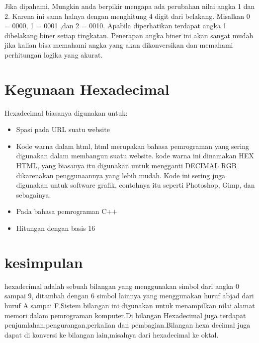 \documentclass{article}
\begin{document}
 Jika dipahami, Mungkin anda berpikir mengapa ada perubahan nilai angka 1 dan 2. Karena ini sama halnya dengan menghitung 4 digit dari belakang.
 Misalkan 0 = 0000, 1 = 0001 ,dan 2 = 0010. Apabila diperhatikan terdapat angka 1 dibelakang biner setiap tingkatan. Penerapan angka biner ini
 akan sangat mudah jika kalian bisa memahami angka yang akan dikonversikan dan memahami perhitungan logika yang akurat.

\section {Kegunaan Hexadecimal}
 Hexadecimal biasanya digunakan untuk:
 \begin{itemize}
   \item Spasi pada URL suatu website
   \item Kode warna dalam html, html merupakan bahasa pemrograman yang sering digunakan dalam membangun suatu website. kode warna ini dinamakan HEX HTML, yang biasanya itu digunakan untuk mengganti DECIMAL RGB dikarenakan penggunaannya yang lebih mudah. Kode ini sering juga digunakan untuk software grafik, contohnya itu seperti Photoshop, Gimp, dan sebagainya.
   \item Pada bahasa pemrograman C++
   \item Hitungan dengan basis 16
 \end{itemize}

\section{kesimpulan}
 hexadecimal adalah sebuah bilangan yang menggunakan simbol dari angka 0 sampai 9, ditambah dengan 6 simbol lainnya yang menggunakan huruf abjad dari huruf A sampai F.Sistem bilangan ini digunakan untuk menampilkan nilai alamat memori dalam pemrograman komputer.Di bilangan Hexadecimal juga terdapat penjumlahan,pengurangan,perkalian dan pembagian.Bilangan hexa decimal juga dapat di konversi ke bilangan lain,misalnya dari hexadecimal ke oktal.
\end{document}
